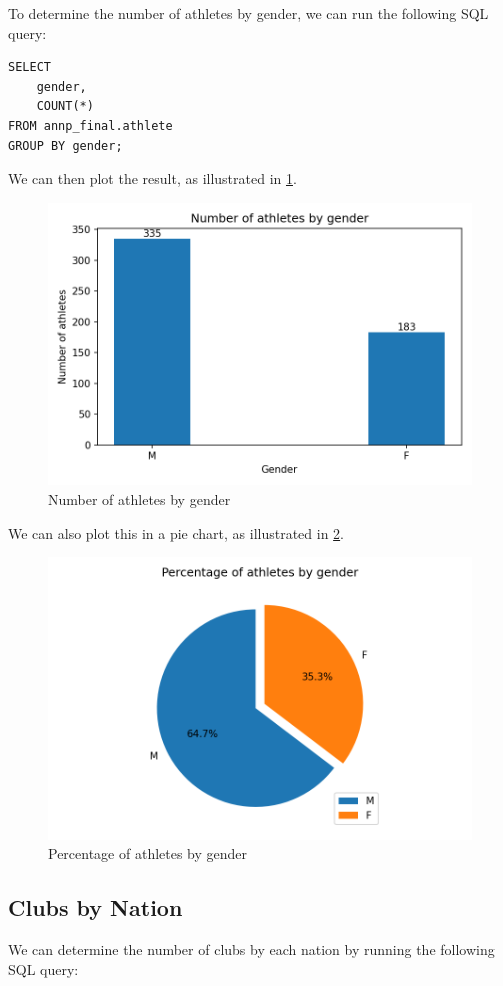 \documentclass[a4paper, 11pt]{article}
\begin{document}
To determine the number of athletes by gender, we can run the following SQL query:

\begin{verbatim}
SELECT
    gender,
    COUNT(*)
FROM annp_final.athlete
GROUP BY gender;
\end{verbatim}

We can then plot the result, as illustrated in \cref{fig:athletesbygender}.

\begin{figure}[H]
    \centering
    \includegraphics[width=.65\textwidth]{img/athletesbygender}
    \caption{Number of athletes by gender}
    \label{fig:athletesbygender}
\end{figure}

We can also plot this in a pie chart, as illustrated in \cref{fig:athletesbygender-pie}.

\begin{figure}[H]
    \centering
    \includegraphics[width=.65\textwidth]{img/athletesbygender-pie}
    \caption{Percentage of athletes by gender}
    \label{fig:athletesbygender-pie}
\end{figure}

\subsection{Clubs by Nation}

We can determine the number of clubs by each nation by running the following SQL query:
\end{document}
